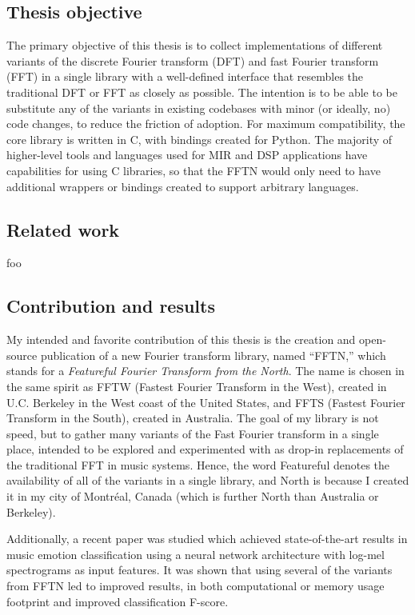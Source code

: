 \documentclass[letter,12pt]{article}
\begin{document}
\subsection{Thesis objective}

The primary objective of this thesis is to collect implementations of different variants of the discrete Fourier transform (DFT) and fast Fourier transform (FFT) in a single library with a well-defined interface that resembles the traditional DFT or FFT as closely as possible. The intention is to be able to be substitute any of the variants in existing codebases with minor (or ideally, no) code changes, to reduce the friction of adoption. For maximum compatibility, the core library is written in C, with bindings created for Python. The majority of higher-level tools and languages used for MIR and DSP applications have capabilities for using C libraries, so that the FFTN would only need to have additional wrappers or bindings created to support arbitrary languages. 

\subsection{Related work}

foo

\subsection{Contribution and results}

My intended and favorite contribution of this thesis is the creation and open-source publication of a new Fourier transform library, named ``FFTN,'' which stands for a \textit{Featureful Fourier Transform from the North}. The name is chosen in the same spirit as FFTW (Fastest Fourier Transform in the West), created in U.C. Berkeley in the West coast of the United States, and FFTS (Fastest Fourier Transform in the South), created in Australia.  The goal of my library is not speed, but to gather many variants of the Fast Fourier transform in a single place, intended to be explored and experimented with as drop-in replacements of the traditional FFT in music systems. Hence, the word Featureful denotes the availability of all of the variants in a single library, and North is because I created it in my city of Montr{\'e}al, Canada (which is further North than Australia or Berkeley).

Additionally, a recent paper \cite{emomucs} was studied which achieved state-of-the-art results in music emotion classification using a neural network architecture with log-mel spectrograms as input features. It was shown that using several of the variants from FFTN led to improved results, in both computational or memory usage footprint and improved classification F-score.
\end{document}

